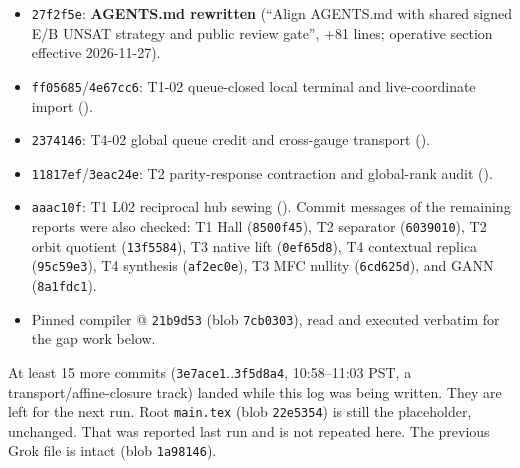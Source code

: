 \documentclass[11pt]{article}
\theoremstyle{definition}
\begin{document}
\begin{itemize}
\item[] \texttt{27f2f5e}: \textbf{AGENTS.md rewritten} (``Align AGENTS.md with shared signed E/B UNSAT strategy and public review gate'', +81 lines; operative section effective 2026-11-27).
\item[] \texttt{ff05685}/\texttt{4e67cc6}: T1-02 queue-closed local terminal and live-coordinate import ().
\item[] \texttt{2374146}: T4-02 global queue credit and cross-gauge transport ().
\item[] \texttt{11817ef}/\texttt{3eac24e}: T2 parity-response contraction and global-rank audit ().
\item[] \texttt{aaac10f}: T1 L02 reciprocal hub sewing (). Commit messages of the remaining reports were also checked: T1 Hall (\texttt{8500f45}), T2 separator (\texttt{6039010}), T2 orbit quotient (\texttt{13f5584}), T3 native lift (\texttt{0ef65d8}), T4 contextual replica (\texttt{95c59e3}), T4 synthesis (\texttt{af2ec0e}), T3 MFC nullity (\texttt{6cd625d}), and GANN (\texttt{8a1fdc1}).
\item[] Pinned compiler  @ \texttt{21b9d53} (blob \texttt{7cb0303}), read and executed verbatim for the gap work below.
\end{itemize}
At least 15 more commits (\texttt{3e7ace1}..\texttt{3f5d8a4}, 10:58--11:03 PST, a transport/affine-closure track) landed while this log was being written. They are left for the next run. Root \texttt{main.tex} (blob \texttt{22e5354}) is still the placeholder, unchanged. That was reported last run and is not repeated here. The previous Grok file  is intact (blob \texttt{1a98146}).
\end{document}
